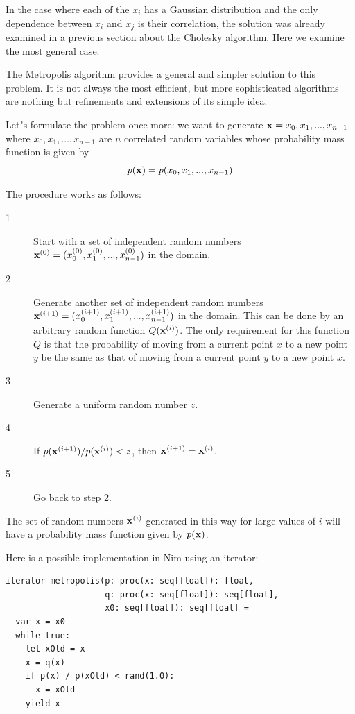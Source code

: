 \documentclass[justified, sixbynine]{tufte-book}
\theoremstyle{plain}%
\newtheorem * {corollary}{Corollary}
\theoremstyle{definition}
\theoremstyle{remark}
\newtheorem * {remark}{Remark}
\newtheorem * {note}{Note}
\begin{document}
\begin{fullwidth}
In the case where each of the $x_i$ has a Gaussian distribution and the only dependence between $x_i$ and $x_j$ is their correlation, the solution was already examined in a previous section about the Cholesky algorithm. Here we examine the most general case.

The Metropolis algorithm provides a general and simpler solution to this problem. It is not always the most efficient, but more sophisticated algorithms are nothing but refinements and extensions of its simple idea.

Let"s formulate the problem once more: we want to generate ${\bf x}%
=x_0, x_1, ..., x_{n-1}$ where $x_0, x_1, ..., x_{n-1}$ are $n$ correlated random
variables whose probability mass function is given by
\begin{equation}
p({\bf x})=p(x_0, x_1, ..., x_{n-1})
\end{equation}

The procedure works as follows:

\begin{description}
\item[1]  Start with a set of independent random numbers ${\bf x}%
^{(0)}=(x_0^{(0)}, x_1^{(0)}, ..., x_{n-1}^{(0)})$ in the domain.

\item[2]  Generate another set of independent random numbers ${\bf x}%
^{(i+1)}=(x_0^{(i+1)}, x_1^{(i+1)}, ..., x_{n-1}^{(i+1)})$ in the domain. This can be done by an arbitrary random function $Q({\bf x}^{(i)})$. The only requirement for this function $Q$ is that the probability of moving from a current point $x$ to a new point $y$ be the same as that of moving from a current point $y$ to a new point $x$.

\item[3]  Generate a uniform random number $z$.

\item[4]  If $p({\bf x}^{(i+1)})/p({\bf x}^{(i)})<z$, then ${\bf x}^{(i+1)}=%
{\bf x}^{(i)}$.

\item[5]  Go back to step 2.
\end{description}

The set of random numbers ${\bf x}^{(i)}$ generated in this way for large
values of $i$ will have a probability mass function given by $p({\bf x})$.

Here is a possible implementation in Nim using an iterator:
\begin{lstlisting}
iterator metropolis(p: proc(x: seq[float]): float,
                    q: proc(x: seq[float]): seq[float],
                    x0: seq[float]): seq[float] =
  var x = x0
  while true:
    let xOld = x
    x = q(x)
    if p(x) / p(xOld) < rand(1.0):
      x = xOld
    yield x


\end{lstlisting}
\end{fullwidth}
\end{document}
